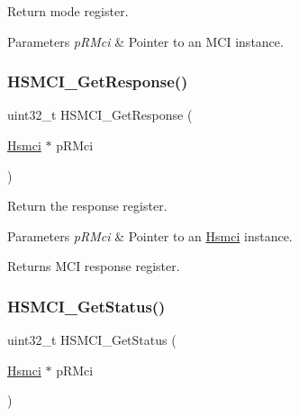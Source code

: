 Return mode register. 


\begin{DoxyParams}{Parameters}
{\em p\+R\+Mci} & Pointer to an M\+CI instance. \\
\hline
\end{DoxyParams}
\mbox{\label{group__hsmci__functions_gafb6f3467813115f494f67c125f821264}} 
\subsubsection{\texorpdfstring{HSMCI\_GetResponse()}{HSMCI\_GetResponse()}}
{\footnotesize\ttfamily uint32\+\_\+t H\+S\+M\+C\+I\+\_\+\+Get\+Response (\begin{DoxyParamCaption}\item[{\mbox{\hyperlink{structHsmci}{Hsmci}} $\ast$}]{p\+R\+Mci }\end{DoxyParamCaption})}



Return the response register. 


\begin{DoxyParams}{Parameters}
{\em p\+R\+Mci} & Pointer to an \mbox{\hyperlink{structHsmci}{Hsmci}} instance. \\
\hline
\end{DoxyParams}
\begin{DoxyReturn}{Returns}
M\+CI response register. 
\end{DoxyReturn}
\mbox{\label{group__hsmci__functions_ga7395ec7b356ef056f786107518137a56}} 
\subsubsection{\texorpdfstring{HSMCI\_GetStatus()}{HSMCI\_GetStatus()}}
{\footnotesize\ttfamily uint32\+\_\+t H\+S\+M\+C\+I\+\_\+\+Get\+Status (\begin{DoxyParamCaption}\item[{\mbox{\hyperlink{structHsmci}{Hsmci}} $\ast$}]{p\+R\+Mci }\end{DoxyParamCaption})}



